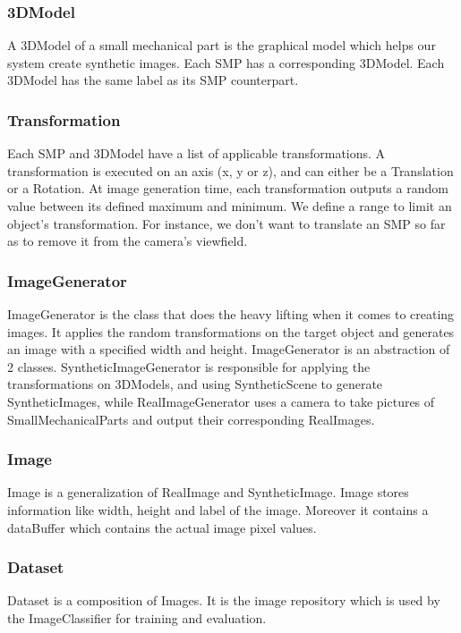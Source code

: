 \documentclass[a4paper,12pt,twoside]{report}
\begin{document}
\subsubsection{3DModel}
A 3DModel of a small mechanical part is the graphical model which helps our system create synthetic images. Each SMP has a corresponding 3DModel. Each 3DModel has the same label as its SMP counterpart.

\subsubsection{Transformation}
Each SMP and 3DModel have a list of applicable transformations. A transformation is executed on an axis (x, y or z), and can either be a Translation or a Rotation.
At image generation time, each transformation outputs a random value between its defined maximum and minimum. We define a range to limit an object's transformation. For instance, we don't want to translate an SMP so far as to remove it from the camera's viewfield.

\subsubsection{ImageGenerator}
ImageGenerator is the class that does the heavy lifting when it comes to creating images. It applies the random transformations on the target object and generates an image with a specified width and height.
ImageGenerator is an abstraction of 2 classes. SyntheticImageGenerator is responsible for applying the transformations on 3DModels, and using SyntheticScene to generate SyntheticImages, while RealImageGenerator uses a camera to take pictures of SmallMechanicalParts and output their corresponding RealImages.

\subsubsection{Image}
Image is a generalization of RealImage and SyntheticImage. Image stores information like width, height and label of the image. Moreover it contains a dataBuffer which contains the actual image pixel values.

\subsubsection{Dataset}
Dataset is a composition of Images. It is the image repository which is used by the ImageClassifier for training and evaluation.
\end{document}
